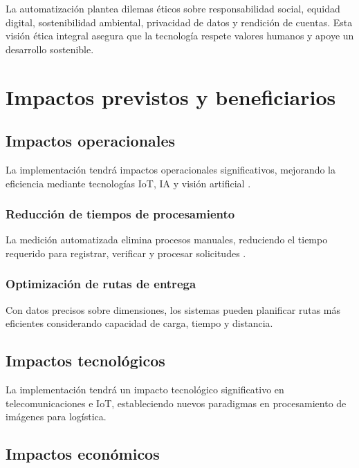 La automatización plantea dilemas éticos sobre responsabilidad social, equidad digital, sostenibilidad ambiental, privacidad de datos y rendición de cuentas. Esta visión ética integral asegura que la tecnología respete valores humanos y apoye un desarrollo sostenible.

\section{Impactos previstos y beneficiarios}

\subsection{Impactos operacionales}

La implementación tendrá impactos operacionales significativos, mejorando la eficiencia mediante tecnologías IoT, IA y visión artificial \cite{RedaccinTLW2024,Alharbi2023}.

\subsubsection{Reducción de tiempos de procesamiento}

La medición automatizada elimina procesos manuales, reduciendo el tiempo requerido para registrar, verificar y procesar solicitudes \cite{Xu2012}.

\subsubsection{Optimización de rutas de entrega}

Con datos precisos sobre dimensiones, los sistemas pueden planificar rutas más eficientes considerando capacidad de carga, tiempo y distancia.

\subsection{Impactos tecnológicos}

La implementación tendrá un impacto tecnológico significativo en telecomunicaciones e IoT, estableciendo nuevos paradigmas en procesamiento de imágenes para logística.

\subsection{Impactos económicos}

